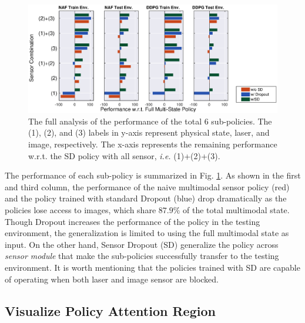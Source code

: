 \documentclass[../thesis.tex]{subfiles}
\begin{document}
\begin{figure}[t]
\vskip -0.1in
\centering
\includegraphics[width=\columnwidth]{./MultimodalDRL/fig/all_policy}
\caption{The full analysis of the performance of the total $6$ sub-policies. The (1), (2), and (3) labels in y-axis represent physical state, laser, and image, respectively. The x-axis represents the remaining performance w.r.t. the SD policy with all sensor, \textit{i.e.} (1)+(2)+(3).}
\label{fig:full-sd-policy}
\vskip -0.1in
\end{figure}
 
The performance of each sub-policy is summarized in Fig. \ref{fig:full-sd-policy}.
As shown in the first and third column, the performance of the naive multimodal sensor policy (red) and the policy trained with standard Dropout (blue) drop dramatically as the policies lose access to images, which share $87.9\%$ of the total multimodal state. Though Dropout increases the performance of the policy in the testing environment, the generalization is limited to using the full multimodal state as input. On the other hand, Sensor Dropout (SD) generalize the policy across \textit{sensor module} that make the sub-policies successfully transfer to the testing environment. It is worth mentioning that the policies trained with SD are capable of operating when both laser and image sensor are blocked.
 
 
\subsection{Visualize Policy Attention Region}
 
\end{document}
